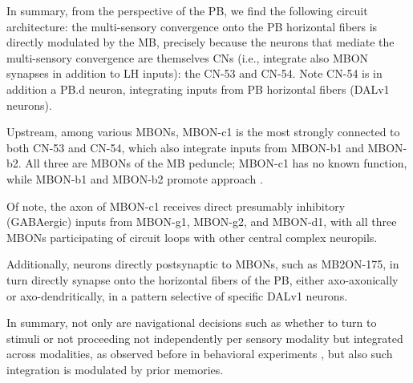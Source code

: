     In summary, from the perspective of the PB, we find the following circuit architecture: the multi-sensory convergence onto the PB horizontal fibers is directly modulated by the MB, precisely because the neurons that mediate the multi-sensory convergence are themselves CNs (i.e., integrate also MBON synapses in addition to LH inputs): the CN-53 and CN-54. %
    Note CN-54 is in addition a PB.d neuron, integrating inputs from PB horizontal fibers (DALv1 neurons).

    Upstream, among various MBONs, MBON-c1 is the most strongly connected to both CN-53 and CN-54, which also integrate inputs from MBON-b1 and MBON-b2. All three are MBONs of the MB peduncle; MBON-c1 has no known function, while MBON-b1 and MBON-b2 promote approach \citep{eschbach2021circuits}.

    Of note, the axon of MBON-c1 receives direct presumably inhibitory (GABAergic) inputs from MBON-g1, MBON-g2, and MBON-d1, with all three MBONs participating of circuit loops with other central complex neuropils.

    Additionally, neurons directly postsynaptic to MBONs, such as MB2ON-175, in turn directly synapse onto the horizontal fibers of the PB, either axo-axonically or axo-dendritically, in a pattern selective of specific DALv1 neurons.

    In summary, not only are navigational decisions such as whether to turn to stimuli or not proceeding not independently per sensory modality but integrated across modalities, as observed before in behavioral experiments \citep{gepner2015computations}, but also such integration is modulated by prior memories.



















